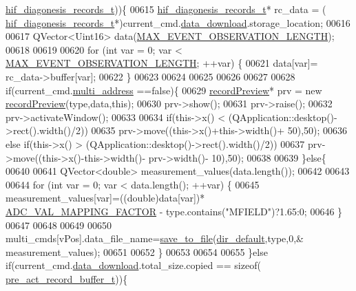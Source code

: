 \begin{DoxyCode}
      \hyperlink{a00006_a4726b814166e222a6f13e21453f76d8d}{hif\_diagonesis\_records\_t}))\{
00615         \hyperlink{a00006_a4726b814166e222a6f13e21453f76d8d}{hif\_diagonesis\_records\_t}* rc\_data = (
      \hyperlink{a00006_a4726b814166e222a6f13e21453f76d8d}{hif\_diagonesis\_records\_t}*)current\_cmd.\hyperlink{a00004_a5cfeaed4d4f8e51070a324c0ba893ebe}{data\_download}.storage\_location;
00616 
00617         QVector<Uint16> data(\hyperlink{a00006_aa060aeb1ecb530b3c6f6d91060999b70}{MAX\_EVENT\_OBSERVATION\_LENGTH});
00618 
00619 
00620         \textcolor{keywordflow}{for} (\textcolor{keywordtype}{int} var = 0; var < \hyperlink{a00006_aa060aeb1ecb530b3c6f6d91060999b70}{MAX\_EVENT\_OBSERVATION\_LENGTH}; ++var) \{
00621             data[var]= rc\_data->buffer[var];
00622         \}
00623 
00624 
00625 
00626 
00627 
00628         \textcolor{keywordflow}{if}(current\_cmd.\hyperlink{a00004_a8e69b971c61ced27a7567efd2bf0db59}{multi\_address} ==\textcolor{keyword}{false})\{
00629         \hyperlink{a00073}{recordPreview}* prv = \textcolor{keyword}{new} \hyperlink{a00073}{recordPreview}(type,data,\textcolor{keyword}{this});
00630         prv->show();
00631         prv->raise();
00632         prv->activateWindow();
00633 
00634         \textcolor{keywordflow}{if}(this->x() < (QApplication::desktop()->rect().width()/2))
00635         prv->move((this->x()+this->width()+ 50),50);
00636         \textcolor{keywordflow}{else} \textcolor{keywordflow}{if}(this->x() > (QApplication::desktop()->rect().width()/2))
00637         prv->move((this->x()-this->width()- prv->width()- 10),50);
00638 
00639         \}\textcolor{keywordflow}{else}\{
00640 
00641             QVector<double> measurement\_values(data.length());
00642 
00643 
00644             \textcolor{keywordflow}{for} (\textcolor{keywordtype}{int} var = 0; var < data.length(); ++var) \{
00645                 measurement\_values[var]=((double)data[var])*
      \hyperlink{a00086_ada92d3eeeec0cbeee41e76a52d145792}{ADC\_VAL\_MAPPING\_FACTOR} - type.contains(\textcolor{stringliteral}{"MFIELD"})?1.65:0;
00646             \}
00647 
00648 
00649 
00650             multi\_cmds[vPos].data\_file\_name=\hyperlink{a00017_a0114355b9f626345cf77d6f714f51468}{save\_to\_file}(\hyperlink{a00017_a2e107e43aeaccaf4c9a42254f13122c8}{dir\_default},type,0,&
      measurement\_values);
00651 
00652         \}
00653 
00654 
00655     \}\textcolor{keywordflow}{else} \textcolor{keywordflow}{if}(current\_cmd.\hyperlink{a00004_a5cfeaed4d4f8e51070a324c0ba893ebe}{data\_download}.total\_size.copied == \textcolor{keyword}{sizeof}(
      \hyperlink{a00006_dc/d52/a00183}{pre\_act\_record\_buffer\_t}))\{

\end{DoxyCode}
